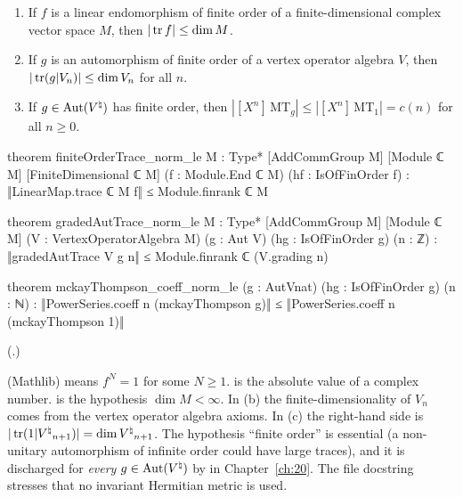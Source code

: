 \begin{theorem}\label{ch16:thm:tracebounds}
\begin{enumerate}[label=(\alph*)]
\item If $f$ is a linear endomorphism of finite order of a finite-dimensional complex vector space $M$, then
  $|\operatorname{tr} f|\le\dim M$.
\item If $g$ is an automorphism of finite order of a vertex operator algebra $V$, then $|\operatorname{tr}(g|V_n)|\le\dim V_n$ for
  all $n$.
\item If $g\in\operatorname{Aut}({V^{\natural}})$ has finite order, then $|[X^n]\,\mathrm{MT}_g|\le|[X^n]\,\mathrm{MT}_1|=c(n)$ for all
  $n\ge0$.
\end{enumerate}
\end{theorem}
\begin{leancode}
theorem finiteOrderTrace_norm_le {M : Type*} [AddCommGroup M] [Module ℂ M]
    [FiniteDimensional ℂ M] (f : Module.End ℂ M) (hf : IsOfFinOrder f) :
    ‖LinearMap.trace ℂ M f‖ ≤ Module.finrank ℂ M

theorem gradedAutTrace_norm_le {M : Type*} [AddCommGroup M] [Module ℂ M]
    (V : VertexOperatorAlgebra M) (g : Aut V) (hg : IsOfFinOrder g) (n : ℤ) :
    ‖gradedAutTrace V g n‖ ≤ Module.finrank ℂ (V.grading n)

theorem mckayThompson_coeff_norm_le (g : AutVnat) (hg : IsOfFinOrder g) (n : ℕ) :
    ‖PowerSeries.coeff n (mckayThompson g)‖ ≤
      ‖PowerSeries.coeff n (mckayThompson 1)‖
\end{leancode}
(.)
\begin{dictionary}
 (Mathlib) means $f^N=1$ for some $N\ge1$.   is the absolute value of a complex number.
\lean{[FiniteDimensional ℂ M]} is the hypothesis $\dim M<\infty$.  In (b) the finite-dimensionality of $V_n$ comes from
the vertex operator algebra axioms.  In (c) the right-hand side is $|\operatorname{tr}(1|{V^{\natural}}_{n+1})|=\dim{V^{\natural}}_{n+1}$.  The
hypothesis ``finite order'' is essential (a non-unitary automorphism of infinite order could have large traces), and
it is discharged for \emph{every} $g\in\operatorname{Aut}({V^{\natural}})$ by  in Chapter~\ref{ch:20}.  The file
docstring stresses that no invariant Hermitian metric is used.
\end{dictionary}
